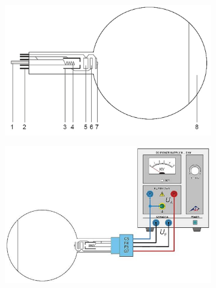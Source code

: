 \documentclass[a4paper]{article}
\begin{document}
\begin{figure}[htbp]
	\centering
	\begin{subfigure}{0.45\textwidth}
		\centering
		\includegraphics[width=\textwidth]{tub-electronic.png}
		\caption{}
	\end{subfigure}
	\begin{subfigure}{0.45\textwidth}
		\centering
		\includegraphics[width=\textwidth]{schema-conexiuni.png}
		\caption{}
	\end{subfigure}
\end{figure}
\end{document}

